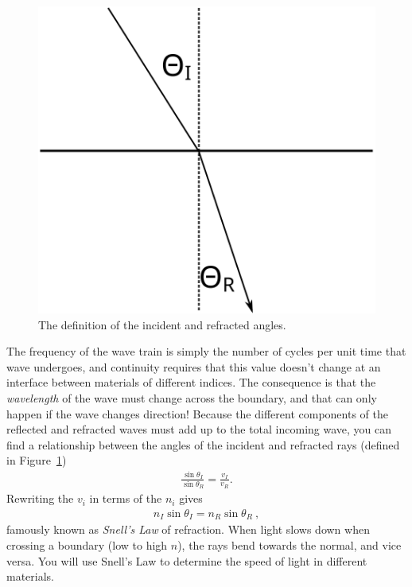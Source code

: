 \documentclass[12pt]{article}
\begin{document}
\begin{figure}
  \centering
  \includegraphics[width=\textwidth/3]{figures/refraction}  
  \caption{The definition of the incident and refracted angles.}
  \label{fig:defs}
\end{figure}
The frequency of the wave train is simply the number of cycles per
unit time that wave undergoes, and continuity requires that this value
doesn't change at an interface between materials of different indices.
The consequence is that the \textit{wavelength} of the wave must
change across the boundary, and that can only happen if the wave
changes direction!  Because the different components of the reflected
and refracted waves must add up to the total incoming wave, you can
find a relationship between the angles of the incident and refracted
rays (defined in Figure~\ref{fig:defs})
\begin{gather*}
  \frac{\sin \theta_I}{\sin \theta_R} = \frac{v_I}{v_R}.
\end{gather*}
Rewriting the $v_i$ in terms of the $n_i$ gives
\begin{gather*}
  n_I \sin\theta_I = n_R \sin\theta_R\ ,
\end{gather*}
famously known as \textit{Snell's Law} of refraction.  When light
slows down when crossing a boundary (low to high $n$), the rays bend
towards the normal, and vice versa.  You will use Snell's Law to
determine the speed of light in different materials.
\end{document}
